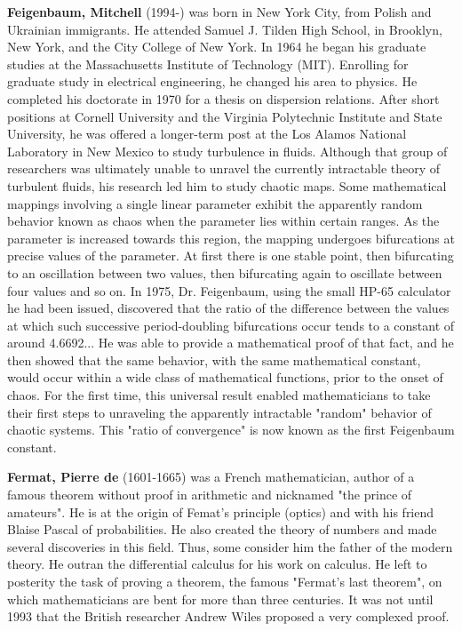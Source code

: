 \textbf{Feigenbaum, Mitchell} (1994-)  was born in New York City, from Polish and Ukrainian immigrants. He attended Samuel J. Tilden High School, in Brooklyn, New York, and the City College of New York. In 1964 he began his graduate studies at the Massachusetts Institute of Technology (MIT). Enrolling for graduate study in electrical engineering, he changed his area to physics. He completed his doctorate in 1970 for a thesis on dispersion relations. After short positions at Cornell University and the Virginia Polytechnic Institute and State University, he was offered a longer-term post at the Los Alamos National Laboratory in New Mexico to study turbulence in fluids. Although that group of researchers was ultimately unable to unravel the currently intractable theory of turbulent fluids, his research led him to study chaotic maps. Some mathematical mappings involving a single linear parameter exhibit the apparently random behavior known as chaos when the parameter lies within certain ranges. As the parameter is increased towards this region, the mapping undergoes bifurcations at precise values of the parameter. At first there is one stable point, then bifurcating to an oscillation between two values, then bifurcating again to oscillate between four values and so on. In 1975, Dr. Feigenbaum, using the small HP-65 calculator he had been issued, discovered that the ratio of the difference between the values at which such successive period-doubling bifurcations occur tends to a constant of around 4.6692... He was able to provide a mathematical proof of that fact, and he then showed that the same behavior, with the same mathematical constant, would occur within a wide class of mathematical functions, prior to the onset of chaos. For the first time, this universal result enabled mathematicians to take their first steps to unraveling the apparently intractable "random" behavior of chaotic systems. This "ratio of convergence" is now known as the first Feigenbaum constant.

\textbf{Fermat, Pierre de} (1601-1665) was a French mathematician, author of a famous theorem without proof in arithmetic and nicknamed "the prince of amateurs". He is at the origin of Femat's principle (optics) and with his friend Blaise Pascal of probabilities. He also created the theory of numbers and made several discoveries in this field. Thus, some consider him the father of the modern theory. He outran the differential calculus for his work on calculus. He left to posterity the task of proving a theorem, the famous "Fermat's last theorem", on which mathematicians are bent for more than three centuries. It was not until 1993 that the British researcher Andrew Wiles proposed a very complexed proof.

